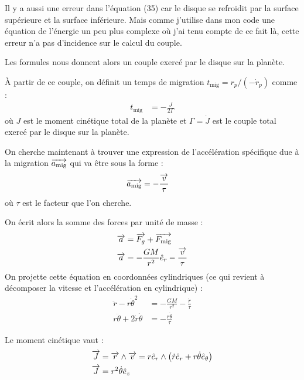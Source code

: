 Il y a aussi une erreur dans l'équation (35) car le disque se refroidit par la surface supérieure et la surface inférieure. Mais comme j'utilise dans mon code une équation de l'énergie  un peu plus complexe où j'ai tenu compte de ce fait là, cette erreur n'a pas d'incidence sur le calcul du couple.

Les formules nous donnent alors un couple exercé par le disque sur la planète. 

À partir de ce couple, on définit un temps de migration $t_\text{mig}=r_p / (-\dot{r}_p)$ comme \citep[eq. 
(69)]{tanaka2002three}: 
\begin{align}
t_\text{mig} &= -\frac{J}{2\Gamma}
\end{align}
où $J$ est le moment cinétique total de la planète et $\Gamma=\dot{J}$ est le couple total exercé par le disque sur la planète.

\bigskip

On cherche maintenant à trouver une expression de l'accélération spécifique due à la migration ${\overrightarrow{a_\text{mig}}}$ qui va être sous la forme : 
\begin{align*}
{\overrightarrow{a_\text{mig}}} &= -\frac{{\overrightarrow{v}}}{\tau}
\end{align*}
où $\tau$ est le facteur que l'on cherche.

On écrit alors la somme des forces par unité de masse : 
\begin{align*}
{\overrightarrow{a}} &= {\overrightarrow{F_g}} + {\overrightarrow{F_\text{mig}}}\\
{\overrightarrow{a}} &= -\frac{GM}{r^2}\hat{e}_r - \frac{{\overrightarrow{v}}}{\tau}
\end{align*}
On projette cette équation en coordonnées cylindriques (ce qui revient à décomposer la vitesse et l'accélération en cylindrique) :
\begin{subequations}
\begin{align}
\ddot{r} - r\dot{\theta}^2 &= -\frac{GM}{r^2} -\frac{\dot{r}}{\tau}\\
r\ddot{\theta} + 2 \dot{r}\dot{\theta} &= - \frac{r\dot{\theta}}{\tau}\label{eq:mig_proj_theta}
\end{align}
\end{subequations}

Le moment cinétique vaut : 
\begin{align*}
\vect{J} &= \vect{r} \wedge \vect{v} = r \hat{e}_r \wedge \left( \dot{r}\hat{e}_r + r\dot{\theta}\hat{e}_\theta\right)\nonumber\\
\vect{J} &= r^2\dot{\theta}\hat{e}_z
\end{align*}

